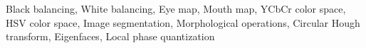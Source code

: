 Black balancing,  White balancing, Eye map, Mouth map, YCbCr color space, HSV color space,  
Image segmentation, Morphological operations, Circular Hough transform, Eigenfaces, Local phase quantization 